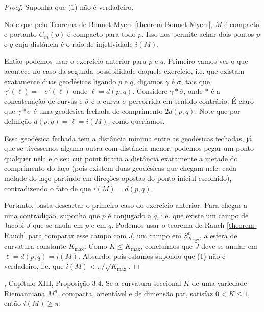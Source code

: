 \documentclass{book}
\begin{document}
\begin{proof}
Suponha que (1) não é verdadeiro.

Note que pelo Teorema de Bonnet-Myers
\ref{theorem-Bonnet-Myers}, $M$ é compacta e
portanto $C_m(p)$ é compacto para
todo $p$. Isso nos permite achar dois pontos
$p$ e $q$ cuja distância é o raio
de injetividade  $i(M)$.

Então podemos usar o exercício anterior para
$p$ e $q$.  Primeiro vamos ver o
que acontece no caso da segunda possibilidade
daquele exercício, i.e. que
existam exatamente duas geodésicas ligando
$p$ e $q$, digamos $\gamma$ é
$\sigma$, tais que
$\gamma'(\ell)=-\sigma'(\ell)$ onde
$\ell=d(p,q)$.  Considere
$\gamma * \overline{\sigma}$, onde $*$ é a
concatenação de curvas e
$\overline{\sigma}$ é a curva $\sigma$
percorrida em sentido contrário. É claro
que $\gamma * \overline{\sigma}$ é uma
geodésica fechada de comprimento $2
d(p,q)$. Note que por definição
$d(p,q)=\ell=i(M)$, como queríamos.

Essa geodésica fechada tem a distância mínima
entre as geodésicas fechadas, já
que se tivéssemos alguma outra com distância
menor, podemos pegar um ponto
qualquer nela e o seu cut point ficaria a
distância exatamente a metade do
comprimento do laço (pois existem duas
geodésicas que chegam nele: cada
metade do laço partindo em direções opostas
do ponto inicial escolhido),
contradizendo o fato de que $i(M)=d(p,q)$.

Portanto, basta descartar o primeiro caso do
exercício anterior. Para chegar a
 uma contradição, suponha que $p $ é
 conjugado a $q$, i.e. que existe um campo
 de Jacobi $J$ que se anula em $p$ e em $q$.
 Podemos usar o teorema de Rauch
\ref{theorem-Rauch} para comparar esse campo
com $\tilde{J}$,
um campo em $S^n_{K_{\text{max}}}$, a esfera
de curvatura constante
 $K_{\text{max}}$. Como $K \leq
 K_{\text{max}}$,
concluímos que $\tilde{J}$ deve se anular em
$\ell=d(p,q)=i(M)$. Absurdo, pois
estamos supondo que (1) não é verdadeiro,
i.e. que
 $i(M) < \pi/\sqrt{K_{\text{max}}}$.
\end{proof}

\begin{exercise}
\label{exercise-l8-3}
\cite{doc}, Capítulo XIII, Proposição 3.4. Se
a curvatura seccional $K$ de uma
variedade Riemanniana $M^n$, compacta,
orientável e de dimensão par, satisfaz
$0<K \leq 1$, então $i(M) \geq \pi$.
\end{exercise}
\end{document}

